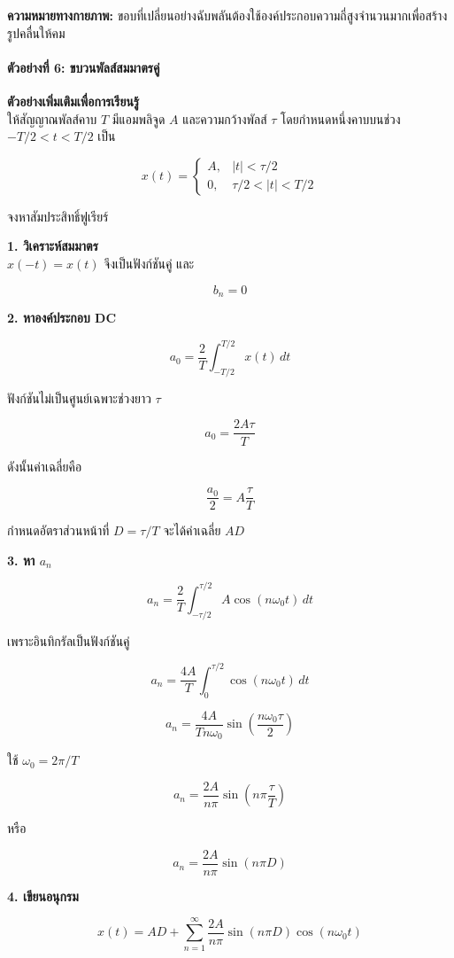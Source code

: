 \textbf{ความหมายทางกายภาพ:} ขอบที่เปลี่ยนอย่างฉับพลันต้องใช้องค์ประกอบความถี่สูงจำนวนมากเพื่อสร้างรูปคลื่นให้คม

\paragraph{ตัวอย่างที่ 6: ขบวนพัลส์สมมาตรคู่}

\textbf{ตัวอย่างเพิ่มเติมเพื่อการเรียนรู้}\\
ให้สัญญาณพัลส์คาบ \(T\) มีแอมพลิจูด \(A\) และความกว้างพัลส์ \(\tau\) โดยกำหนดหนึ่งคาบบนช่วง \(-T/2<t<T/2\) เป็น

\[
x(t)=
\begin{cases}
A, & |t|<\tau/2\\
0, & \tau/2<|t|<T/2
\end{cases}
\]

จงหาสัมประสิทธิ์ฟูเรียร์

\textbf{1. วิเคราะห์สมมาตร}\\
\(x(-t)=x(t)\) จึงเป็นฟังก์ชันคู่ และ

\[
b_n=0
\]

\textbf{2. หาองค์ประกอบ DC}

\[
a_0=\frac{2}{T}\int_{-T/2}^{T/2}x(t)\,dt
\]

ฟังก์ชันไม่เป็นศูนย์เฉพาะช่วงยาว \(\tau\)

\[
a_0=\frac{2A\tau}{T}
\]

ดังนั้นค่าเฉลี่ยคือ

\[
\frac{a_0}{2}=A\frac{\tau}{T}
\]

กำหนดอัตราส่วนหน้าที่ \(D=\tau/T\) จะได้ค่าเฉลี่ย \(AD\)

\textbf{3. หา \(a_n\)}

\[
a_n=\frac{2}{T}\int_{-\tau/2}^{\tau/2}A\cos(n\omega_0t)\,dt
\]

เพราะอินทิกรัลเป็นฟังก์ชันคู่

\[
a_n=\frac{4A}{T}\int_0^{\tau/2}\cos(n\omega_0t)\,dt
\]

\[
a_n=\frac{4A}{Tn\omega_0}\sin\left(\frac{n\omega_0\tau}{2}\right)
\]

ใช้ \(\omega_0=2\pi/T\)

\[
a_n=\frac{2A}{n\pi}\sin\left(n\pi\frac{\tau}{T}\right)
\]

หรือ

\[
a_n=\frac{2A}{n\pi}\sin(n\pi D)
\]

\textbf{4. เขียนอนุกรม}

\[
x(t)=AD+\sum_{n=1}^{\infty}\frac{2A}{n\pi}\sin(n\pi D)\cos(n\omega_0t)
\]

